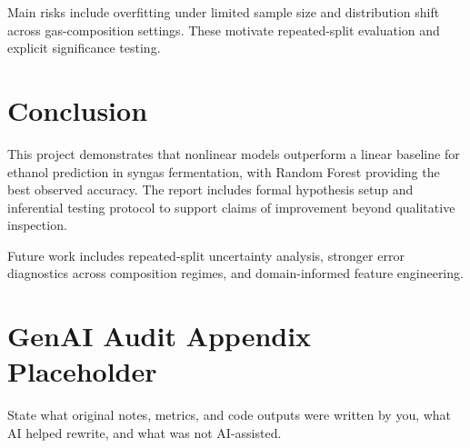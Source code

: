 \documentclass[conference]{IEEEtran}
\begin{document}
Main risks include overfitting under limited sample size and distribution shift across gas-composition settings. These motivate repeated-split evaluation and explicit significance testing.

\section{Conclusion}
This project demonstrates that nonlinear models outperform a linear baseline for ethanol prediction in syngas fermentation, with Random Forest providing the best observed accuracy. The report includes formal hypothesis setup and inferential testing protocol to support claims of improvement beyond qualitative inspection.

Future work includes repeated-split uncertainty analysis, stronger error diagnostics across composition regimes, and domain-informed feature engineering.

\section*{GenAI Audit Appendix Placeholder}
State what original notes, metrics, and code outputs were written by you, what AI helped rewrite, and what was not AI-assisted.



\end{document}
